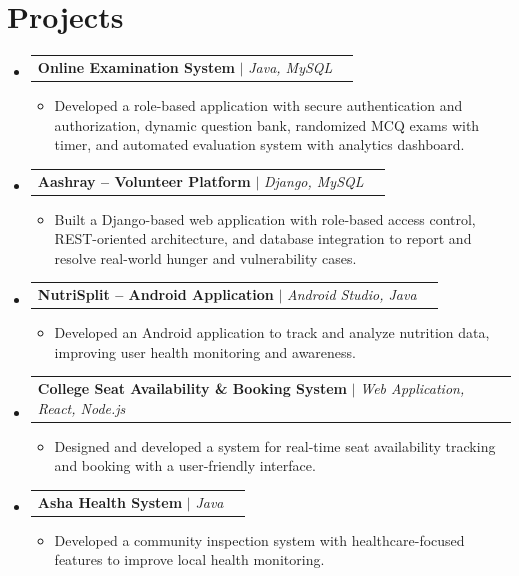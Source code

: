 \documentclass[a4paper,11pt]{article}
\makeatletter
\newcommand{\resumeItem}[1]{
  \item\small{
    {#1 \vspace{-2pt}}
  }
}
\newcommand{\resumeProjectHeading}[2]{
    \item
    \begin{tabular*}{0.97\textwidth}{l@{\extracolsep{\fill}}r}
      \small#1 & #2 \\
    \end{tabular*}\vspace{-7pt}
}
\newcommand{\resumeSubHeadingListStart}{\begin{itemize}[leftmargin=0.15in, label={}]}
\newcommand{\resumeSubHeadingListEnd}{\end{itemize}}
\newcommand{\resumeItemListStart}{\begin{itemize}}
\newcommand{\resumeItemListEnd}{\end{itemize}\vspace{-5pt}}
\makeatother
\begin{document}
\section{Projects}
    \resumeSubHeadingListStart

      \resumeProjectHeading
          {\textbf{Online Examination System} $|$ \emph{Java, MySQL}}{}
          \resumeItemListStart
            \resumeItem{Developed a role-based application with secure authentication and authorization, dynamic question bank, randomized MCQ exams with timer, and automated evaluation system with analytics dashboard.}
          \resumeItemListEnd

      \resumeProjectHeading
          {\textbf{Aashray -- Volunteer Platform} $|$ \emph{Django, MySQL}}{}
          \resumeItemListStart
            \resumeItem{Built a Django-based web application with role-based access control, REST-oriented architecture, and database integration to report and resolve real-world hunger and vulnerability cases.}
          \resumeItemListEnd

      \resumeProjectHeading
          {\textbf{NutriSplit -- Android Application} $|$ \emph{Android Studio, Java}}{}
          \resumeItemListStart
            \resumeItem{Developed an Android application to track and analyze nutrition data, improving user health monitoring and awareness.}
          \resumeItemListEnd

      \resumeProjectHeading
          {\textbf{College Seat Availability \& Booking System} $|$ \emph{Web Application, React, Node.js}}{}
          \resumeItemListStart
            \resumeItem{Designed and developed a system for real-time seat availability tracking and booking with a user-friendly interface.}
          \resumeItemListEnd

      \resumeProjectHeading
          {\textbf{Asha Health System} $|$ \emph{Java}}{}
          \resumeItemListStart
            \resumeItem{Developed a community inspection system with healthcare-focused features to improve local health monitoring.}
          \resumeItemListEnd

    \resumeSubHeadingListEnd
\end{document}
